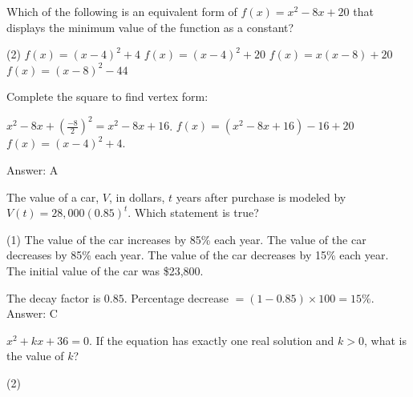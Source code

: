\documentclass[11pt,paper=a4,answers]{exam}
\begin{document}
\begin{questions}
\vspace{1cm}

\question
Which of the following is an equivalent form of $f(x) = x^2 - 8x + 20$ that displays the minimum value of the function as a constant?
\begin{tasks}(2)
    \task $f(x) = (x - 4)^2 + 4$
    \task $f(x) = (x - 4)^2 + 20$
    \task $f(x) = x(x - 8) + 20$
    \task $f(x) = (x - 8)^2 - 44$
\end{tasks}

\begin{solution}
Complete the square to find vertex form:
\vspace{5pt}
\begin{center}
$x^2 - 8x + (\frac{-8}{2})^2 = x^2 - 8x + 16$.
\vspace{5pt}
$f(x) = (x^2 - 8x + 16) - 16 + 20$
\vspace{5pt}
$f(x) = (x - 4)^2 + 4$.
\end{center}
\vspace{5pt}
Answer: \colorbox{yellow!100}{A}
\end{solution}

\vspace{1cm}

\question
The value of a car, $V$, in dollars, $t$ years after purchase is modeled by $V(t) = 28,000(0.85)^t$. Which statement is true?
\begin{tasks}(1)
    \task The value of the car increases by 85\% each year.
    \task The value of the car decreases by 85\% each year.
    \task The value of the car decreases by 15\% each year.
    \task The initial value of the car was \$23,800.
\end{tasks}

\begin{solution}
The decay factor is $0.85$. Percentage decrease $= (1 - 0.85) \times 100 = 15\%$.
\vspace{5pt}
Answer: \colorbox{yellow!100}{C}
\end{solution}

\vspace{1cm}

\question
$x^2 + kx + 36 = 0$. If the equation has exactly one real solution and $k > 0$, what is the value of $k$?
\begin{tasks}(2)
       
\end{tasks}


\end{questions}
\end{document}
